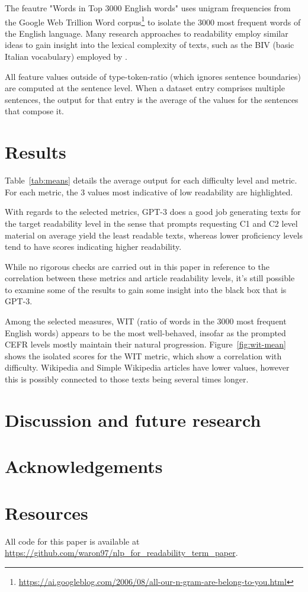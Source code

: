 \documentclass[11pt]{article}
\begin{document}
The feautre "Words in Top 3000 English words" uses unigram frequencies from the Google Web Trillion Word corpus\footnote{\url{https://ai.googleblog.com/2006/08/all-our-n-gram-are-belong-to-you.html}} to isolate the 3000 most frequent words of the English language. Many research approaches to readability employ similar ideas to gain insight into the lexical complexity of texts, such as the BIV (basic Italian vocabulary) employed by \citep{dellorletta-etal-2011-read}.

All feature values outside of type-token-ratio (which ignores sentence boundaries) are computed at the sentence level. When a dataset entry comprises multiple sentences, the output for that entry is the average of the values for the sentences that compose it. 

\section{Results}



Table~\ref{tab:means} details the average output for each difficulty level and metric. For each metric, the 3 values most indicative of low readability are highlighted.

With regards to the selected metrics, GPT-3 does a good job generating texts for the target readability level in the sense that prompts requesting C1 and C2 level material on average yield the least readable texts, whereas lower proficiency levels tend to have scores indicating higher readability.
 
While no rigorous checks are carried out in this paper in reference to the correlation between these metrics and article readability levels, it's still possible to examine some of the results to gain some insight into the black box that is GPT-3.



Among the selected measures, WIT (ratio of words in the 3000 most frequent English words) appears to be the most well-behaved, insofar as the prompted CEFR levels mostly maintain their natural progression. Figure~\ref{fig:wit-mean} shows the isolated scores for the WIT metric, which show a correlation with difficulty. Wikipedia and Simple Wikipedia articles have lower values, however this is possibly connected to those texts being several times longer.



\section{Discussion and future research}

\section*{Acknowledgements}




\appendix
\section*{Resources}

\label{sec:appendix}

All code for this paper is available at \url{https://github.com/waron97/nlp_for_readability_term_paper}.
\end{document}
